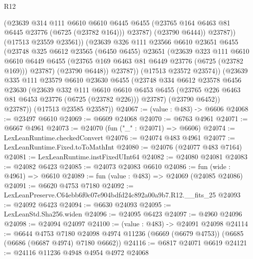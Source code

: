 \begin{lexlean}{R12}
\begin{coremodule}
                    (@23639
                      @314
                      @111
                      @6610
                      @6610
                      @6445
                      @6455
                      (@23765 @164 @6463 @81 @6445 @23776 (@6725 (@23782 @164)))
                      @23787)
                    (@23790 @6444))
                  @23787))
              (@17513 @23559 @23561))
            (@23639
              @326
              @111
              @23566
              @6610
              @23651
              @6455
              (@23748
                @325
                @6612
                @23565
                (@6450 @6455)
                @23651
                (@23639
                  @323
                  @111
                  @6610
                  @6610
                  @6449
                  @6455
                  (@23765 @169 @6463 @81 @6449 @23776 (@6725 (@23782 @169)))
                  @23787)
                (@23790 @6448))
              @23787))
          (@17513 @23572 @23574))
        (@23639
          @335
          @111
          @23579
          @6610
          @23630
          @6455
          (@23748
            @334
            @6612
            @23578
            @6456
            @23630
            (@23639
              @332
              @111
              @6610
              @6610
              @6453
              @6455
              (@23765 @226 @6463 @81 @6453 @23776 (@6725 (@23782 @226)))
              @23787)
            (@23790 @6452))
          @23787))
      (@17513 @23585 @23587))
@24067 := (value : @483) -> @6606
@24068 := @23497 @6610
@24069 := @6609 @24068
@24070 := @6763 @4961
@24071 := @6667 @4961
@24073 := @24070 (fun ("_" : @24071) => @6606)
@24074 := LexLeanRuntime.checkedConvert
@24076 := @24074 @483 @4961
@24077 := LexLeanRuntime.Fixed.toToMathInt
@24080 := @24076 (@24077 @483 @7164)
@24081 := LexLeanRuntime.instFixedUInt64
@24082 := @24080 @24081
@24083 := @24082 @6423
@24085 := @24073 @24083 @6610
@24086 := fun (wide : @4961) => @6610
@24089 := fun (value : @483) => @24069 (@24085 @24086)
@24091 := @6620 @4753 @7180
@24092 := LexLeanPreserve.C64ebb6f0c07e904bdfd24c892a00a9b7.R12.__fits_25
@24093 := @24092 @6423
@24094 := @6630 @24093
@24095 := LexLeanStd.Sha256.widen
@24096 := @24095 @6423
@24097 := @4960 @24096
@24098 := @24094 @24097
@24100 := (value : @483) -> @24091 @24098
@24114 := @6644
    @4753
    @7180
    @24098
    @4974
    @11236
    (@6669 (@6679 @4753))
    (@6685 (@6686 (@6687 @4974) @7180 @6662))
@24116 := @6817 @24071 @6619
@24121 := @24116 @11236 @4948 @4954 @4972 @24068

\end{coremodule}
\end{lexlean}
